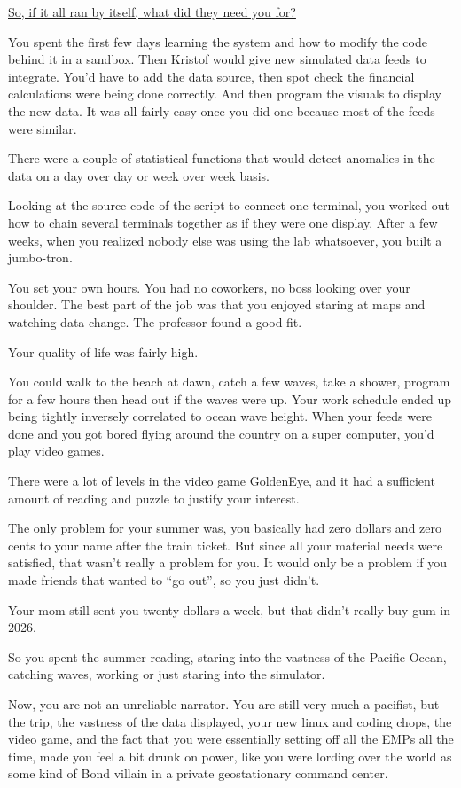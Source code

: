 \documentclass[17pt, twoside, a5paper, openright, extrafontsizes]{memoir}
\renewcommand{\emph}[1]{\ul{#1}}
\begin{document}
\emph{So, if it all ran by itself, what did they need you for?}

You spent the first few days learning the system and how to modify the
code behind it in a sandbox. Then Kristof would give new simulated data
feeds to integrate. You'd have to add the data source, then spot check
the financial calculations were being done correctly. And then program
the visuals to display the new data. It was all fairly easy once you did
one because most of the feeds were similar.

There were a couple of statistical functions that would detect anomalies
in the data on a day over day or week over week basis.

Looking at the source code of the script to connect one terminal, you
worked out how to chain several terminals together as if they were one
display. After a few weeks, when you realized nobody else was using the
lab whatsoever, you built a jumbo-tron.

You set your own hours. You had no coworkers, no boss looking over your
shoulder. The best part of the job was that you enjoyed staring at maps
and watching data change. The professor found a good fit.

Your quality of life was fairly high.

You could walk to the beach at dawn, catch a few waves, take a shower,
program for a few hours then head out if the waves were up. Your work
schedule ended up being tightly inversely correlated to ocean wave
height. When your feeds were done and you got bored flying around the
country on a super computer, you'd play video games.

There were a lot of levels in the video game GoldenEye, and it had a
sufficient amount of reading and puzzle to justify your interest.

The only problem for your summer was, you basically had zero dollars and
zero cents to your name after the train ticket. But since all your
material needs were satisfied, that wasn't really a problem for you. It
would only be a problem if you made friends that wanted to ``go out'',
so you just didn't.

Your mom still sent you twenty dollars a week, but that didn't really
buy gum in 2026.

So you spent the summer reading, staring into the vastness of the
Pacific Ocean, catching waves, working or just staring into the
simulator.

Now, you are not an unreliable narrator. You are still very much a
pacifist, but the trip, the vastness of the data displayed, your new
linux and coding chops, the video game, and the fact that you were
essentially setting off all the EMPs all the time, made you feel a bit
drunk on power, like you were lording over the world as some kind of
Bond villain in a private geostationary command center.
\end{document}

